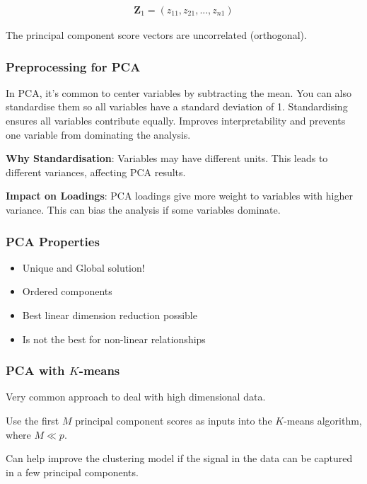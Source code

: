 \begin{align*}
    \boldsymbol{Z}_1 = (z_{11},z_{21},...,z_{n1})
\end{align*}

The principal component score vectors are uncorrelated (orthogonal).

\subsubsection{Preprocessing for PCA}

\indent 

In PCA, it’s common to center variables by subtracting the mean. You can also standardise them so all variables have a standard deviation of 1. Standardising ensures all variables contribute equally. Improves interpretability and prevents one variable from dominating the analysis.

\noindent \textbf{Why Standardisation}: Variables may have different units. This leads to different variances, affecting PCA results.

\noindent \textbf{Impact on Loadings}: PCA loadings give more weight to variables with higher variance. This can bias the analysis if some variables dominate.

\subsubsection{PCA Properties}

\begin{itemize}
    \item Unique and Global solution!
    \item Ordered components
    \item Best linear dimension reduction possible
    \item Is not the best for non-linear relationships
\end{itemize}

\subsubsection{PCA with $K$-means}

\indent 

Very common approach to deal with high dimensional data.

Use the first $M$ principal component scores as inputs into the $K$-means algorithm, where $M\ll p$.

Can help improve the clustering model if the signal in the data can be captured in a few principal components.

